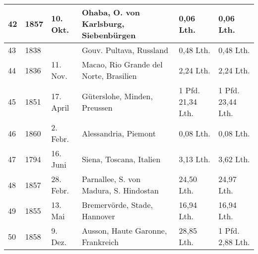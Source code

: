 \documentclass[a4paper, 11pt, oneside]{article}
\begin{document}
\begin{center}
\begin{footnotesize}
\begin{tabular}{ |p{7mm}|p{7mm}|p{13mm}|p{48mm}|p{22mm}|p{22mm}| }
    42 & 1857 & 10. Okt. & Ohaba, O. von Karlsburg, Siebenbürgen & 0,06 Lth. & 0,06 Lth.\\\hline
    43 & 1838 &  & Gouv. Pultava, Russland & 0,48 Lth. & 0,48 Lth.\\\hline
    44 & 1836 & 11. Nov. & Macao, Rio Grande del Norte, Brasilien & 2,24 Lth. & 2,24 Lth.\\\hline
    45 & 1851 & 17. April & Güterslohe, Minden, Preussen & 1 Pfd. 21,34 Lth. & 1 Pfd. 23,44 Lth.\\\hline
    46 & 1860 & 2. Febr. & Alessandria, Piemont & 0,08 Lth. & 0,08 Lth.\\\hline
    47 & 1794 & 16. Juni & Siena, Toscana, Italien & 3,13 Lth. & 3,62 Lth.\\\hline
    48 & 1857 & 28. Febr. & Parnallee, S. von Madura, S. Hindostan & 24,50 Lth. & 24,97 Lth.\\\hline
    49 & 1855 & 13. Mai & Bremervörde, Stade, Hannover & 16,94 Lth. & 16,94 Lth.\\\hline
    50 & 1858 & 9. Dez. & Ausson, Haute Garonne, Frankreich & 28,85 Lth. & 1 Pfd. 2,88 Lth.\\
    \hline
\end{tabular}
\end{footnotesize}
\end{center}
\end{document}
